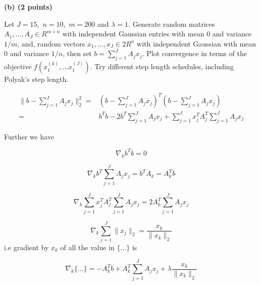 \documentclass{article}
\begin{document}
\textbf{(b) (2 points)}

Let $J = 15,$ $n = 10,$ $m = 200$ and $\lambda = 1.$ Generate random matrices
$A_1, \dots , A_J \in R^{m\times n}$ with independent Gaussian entries with mean $ 0$ and variance
$1/m$, and, random vectors $x_1, \dots,  x_J \in 2 R^n$ with independent Gaussian with mean
$0$ and variance $1/n$, then set 
$b = \sum_{j = 1}^{J} A_j x_j.$
Plot convergence in terms of the
objective $f(x_1^{(k)}, \dots x_1^{(J)}).$ 
Try different step length schedules, including Polyak's
step length.

\begin{align*}
\lVert b - \sum_{j = 1}^{J} 
A_j x_j \rVert_2^2 = & 
(b - \sum_{j = 1}^{J} A_j x_j)^T (b - \sum_{j = 1}^{J} A_j x_j) \\ = &  
b^T b - 2 b^T \sum_{j = 1}^{J} A_j x_j + \sum_{j = 1}^{J} x_j^T A_j^T \sum_{j = 1}^{J} A_j x_j
\end{align*}

Further we have

$$
\nabla_k b^Tb = 0
$$

$$
\nabla_k b^T \sum_{j = 1}^{J} A_j x_j = 
b^T A_k = A_k^T b
$$

$$
\nabla_k \sum_{j = 1}^{J} x_j^T A_j^T \sum_{j = 1}^{J} A_j x_j 
= 2 A_k^T \sum_{j = 1}^{J} A_j x_j 
$$

$$
\nabla_k  \sum_{j = 1}^{J} \lVert x_j \rVert_2 = \frac{x_k} {\lVert x_k \rVert_2}
$$
i.e gradient by $x_k$ of all the value in 
$\bigg \{ \dots \bigg \}$ is

$$
\nabla_k \bigg \{ \dots \bigg \} = - A_k^T b + 
A_k^T \sum_{j = 1}^{J} A_j x_j  + 
\lambda \frac{x_k} {\lVert x_k \rVert_2}
$$
\end{document}
